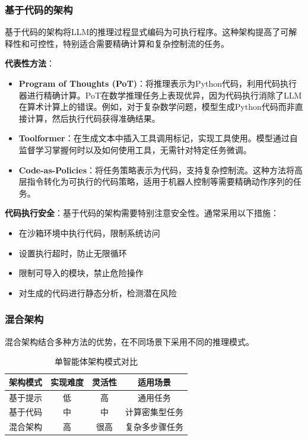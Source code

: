 \subsubsection{基于代码的架构}

基于代码的架构将LLM的推理过程显式编码为可执行程序。这种架构提高了可解释性和可控性，特别适合需要精确计算和复杂控制流的任务。

\textbf{代表性方法}：
\begin{itemize}[leftmargin=2em]
    \item \textbf{Program of Thoughts (PoT)}：将推理表示为Python代码，利用代码执行器进行精确计算。PoT在数学推理任务上表现优异，因为代码执行消除了LLM在算术计算上的错误。例如，对于复杂数学问题，模型生成Python代码而非直接计算，然后执行代码获得准确结果。
    
    \item \textbf{Toolformer}：在生成文本中插入工具调用标记，实现工具使用。模型通过自监督学习掌握何时以及如何使用工具，无需针对特定任务微调。
    
    \item \textbf{Code-as-Policies}：将任务策略表示为代码，支持复杂控制流。这种方法将高层指令转化为可执行的代码策略，适用于机器人控制等需要精确动作序列的任务。
\end{itemize}

\textbf{代码执行安全}：基于代码的架构需要特别注意安全性。通常采用以下措施：
\begin{itemize}[leftmargin=2em]
    \item 在沙箱环境中执行代码，限制系统访问
    \item 设置执行超时，防止无限循环
    \item 限制可导入的模块，禁止危险操作
    \item 对生成的代码进行静态分析，检测潜在风险
\end{itemize}

\subsubsection{混合架构}

混合架构结合多种方法的优势，在不同场景下采用不同的推理模式。

\begin{table}[htbp]
    \centering
    \caption{单智能体架构模式对比}
    \label{tab:single-agent-comparison}
    \begin{tabular}{@{}lccc@{}}
        \toprule
        \textbf{架构模式} & \textbf{实现难度} & \textbf{灵活性} & \textbf{适用场景} \\
        \midrule
        基于提示 & 低 & 高 & 通用任务 \\
        基于代码 & 中 & 中 & 计算密集型任务 \\
        混合架构 & 高 & 很高 & 复杂多步骤任务 \\
        \bottomrule
    \end{tabular}
\end{table}

